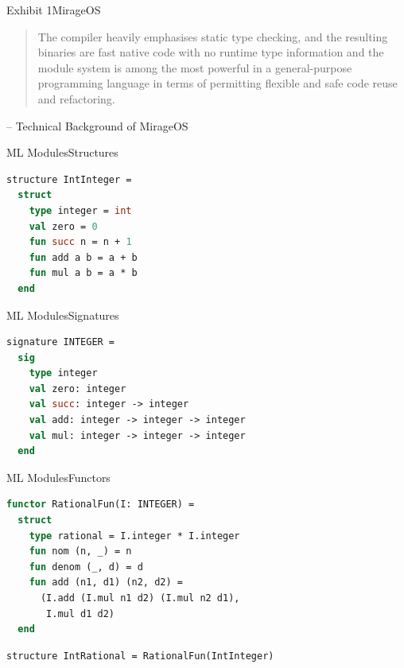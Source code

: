 \documentclass{beamer}
\begin{document}
\begin{frame}{Exhibit 1}{MirageOS}
\begin{quote}
The compiler heavily emphasises static type checking, and the resulting binaries are fast native code with no runtime type information and the module system is among the most powerful in a general-purpose programming language in terms of permitting flexible and safe code reuse and refactoring.
\end{quote}
-- Technical Background of MirageOS
\end{frame}

\begin{frame}[fragile]{ML Modules}{Structures}
\begin{lstlisting}[language=ML]
structure IntInteger =
  struct
    type integer = int
    val zero = 0
    fun succ n = n + 1
    fun add a b = a + b
    fun mul a b = a * b
  end
\end{lstlisting}
\end{frame}

\begin{frame}[fragile]{ML Modules}{Signatures}
\begin{lstlisting}[language=ML]
signature INTEGER =
  sig
    type integer
    val zero: integer
    val succ: integer -> integer
    val add: integer -> integer -> integer
    val mul: integer -> integer -> integer
  end
\end{lstlisting}
\end{frame}

\begin{frame}[fragile]{ML Modules}{Functors}
\begin{lstlisting}[language=ML]
functor RationalFun(I: INTEGER) =
  struct
    type rational = I.integer * I.integer
    fun nom (n, _) = n
    fun denom (_, d) = d
    fun add (n1, d1) (n2, d2) =
      (I.add (I.mul n1 d2) (I.mul n2 d1),
       I.mul d1 d2)
  end
\end{lstlisting}
\begin{lstlisting}[language=ML]
structure IntRational = RationalFun(IntInteger)
\end{lstlisting}
\end{frame}
\end{document}
